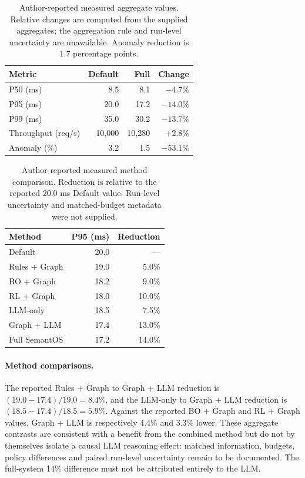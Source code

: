 \begin{table}[t]
\centering\small
\caption{Author-reported measured aggregate values. Relative changes are computed from the supplied aggregates; the aggregation rule and run-level uncertainty are unavailable. Anomaly reduction is 1.7 percentage points.}
\label{tab:reference-performance}
\begin{tabular}{lrrr}
\toprule
Metric & Default & Full & Change \\
\midrule
P50 (ms) & 8.5 & 8.1 & $-4.7\%$ \\
P95 (ms) & 20.0 & 17.2 & $-14.0\%$ \\
P99 (ms) & 35.0 & 30.2 & $-13.7\%$ \\
Throughput (req/s) & 10,000 & 10,280 & $+2.8\%$ \\
Anomaly (\%) & 3.2 & 1.5 & $-53.1\%$ \\
\bottomrule
\end{tabular}
\end{table}
\begin{table}[t]
\centering\small
\caption{Author-reported measured method comparison. Reduction is relative to the reported 20.0 ms Default value. Run-level uncertainty and matched-budget metadata were not supplied.}
\label{tab:reference-methods}
\begin{tabular}{lrr}
\toprule
Method & P95 (ms) & Reduction \\
\midrule
Default & 20.0 & --- \\
Rules + Graph & 19.0 & 5.0\% \\
BO + Graph & 18.2 & 9.0\% \\
RL + Graph & 18.0 & 10.0\% \\
LLM-only & 18.5 & 7.5\% \\
Graph + LLM & 17.4 & 13.0\% \\
Full SemantOS & 17.2 & 14.0\% \\
\bottomrule
\end{tabular}
\end{table}
\paragraph{Method comparisons.}
The reported Rules + Graph to Graph + LLM reduction is $(19.0-17.4)/19.0=8.4\%$, and the LLM-only to Graph + LLM reduction is $(18.5-17.4)/18.5=5.9\%$. Against the reported BO + Graph and RL + Graph values, Graph + LLM is respectively 4.4\% and 3.3\% lower. These aggregate contrasts are consistent with a benefit from the combined method but do not by themselves isolate a causal LLM reasoning effect: matched information, budgets, policy differences and paired run-level uncertainty remain to be documented. The full-system 14\% difference must not be attributed entirely to the LLM.

